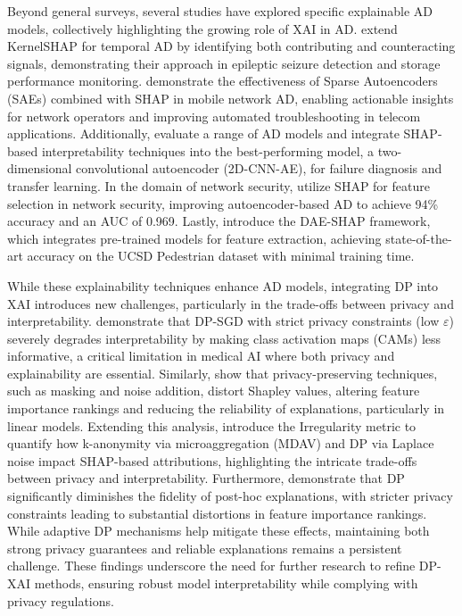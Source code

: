 Beyond general surveys, several studies have explored specific explainable AD models, collectively highlighting the growing role of XAI in AD. \cite{giurgiu2019additive} extend KernelSHAP for temporal AD by identifying both contributing and counteracting signals, demonstrating their approach in epileptic seizure detection and storage performance monitoring. \cite{chawla2020interpretable} demonstrate the effectiveness of Sparse Autoencoders (SAEs) combined with SHAP in mobile network AD, enabling actionable insights for network operators and improving automated troubleshooting in telecom applications. Additionally, \cite{serradilla2021adaptable} evaluate a range of AD models and integrate SHAP-based interpretability techniques into the best-performing model, a two-dimensional convolutional autoencoder (2D-CNN-AE), for failure diagnosis and transfer learning. In the domain of network security, \cite{roshan2021utilizing} utilize SHAP for feature selection in network security, improving autoencoder-based AD to achieve 94\% accuracy and an AUC of 0.969. Lastly, \cite{wu2022explainable} introduce the DAE-SHAP framework, which integrates pre-trained models for feature extraction, achieving state-of-the-art accuracy on the UCSD Pedestrian dataset with minimal training time.

While these explainability techniques enhance AD models, integrating DP into XAI introduces new challenges, particularly in the trade-offs between privacy and interpretability. \cite{naidu2021differential} demonstrate that DP-SGD with strict privacy constraints (low $\varepsilon$) severely degrades interpretability by making class activation maps (CAMs) less informative, a critical limitation in medical AI where both privacy and explainability are essential. Similarly, \cite{bozorgpanah2022privacy} show that privacy-preserving techniques, such as masking and noise addition, distort Shapley values, altering feature importance rankings and reducing the reliability of explanations, particularly in linear models. Extending this analysis, \cite{bozorgpanah2024explainable} introduce the Irregularity metric to quantify how k-anonymity via microaggregation (MDAV) and DP via Laplace noise impact SHAP-based attributions, highlighting the intricate trade-offs between privacy and interpretability. Furthermore, \cite{patel2022model} demonstrate that DP significantly diminishes the fidelity of post-hoc explanations, with stricter privacy constraints leading to substantial distortions in feature importance rankings. While adaptive DP mechanisms help mitigate these effects, maintaining both strong privacy guarantees and reliable explanations remains a persistent challenge. These findings underscore the need for further research to refine DP-XAI methods, ensuring robust model interpretability while complying with privacy regulations.

